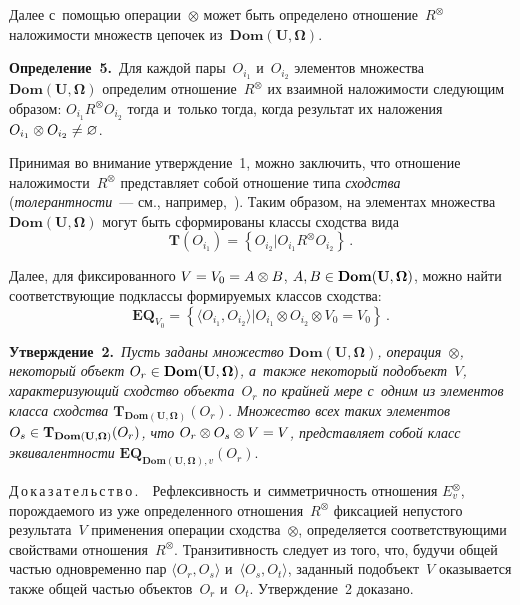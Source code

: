 \begin{multicols}{2}
  Далее с~помощью операции~$\otimes$ может быть определено 
отношение~$R^{\otimes}$ наложимости множеств цепочек 
из~$\mathbf{Dom}(\mathbf{U},\boldsymbol{\Omega})$.
  
  \smallskip
  
  \noindent
  \textbf{Определение~5.}\ Для каж\-дой пары~$O_{i_1}$ и~$O_{i_2}$ элементов 
множества $\mathbf{Dom}(\mathbf{U}, \boldsymbol{\Omega})$ определим 
отношение~$R^{\otimes}$ их взаимной на\-ло\-жи\-мости сле\-ду\-ющим образом: 
$O_{i_1} R^{\otimes} O_{i_2}$ тогда и~только тогда, когда результат их 
наложения $O_{i_1}\otimes O_{i_2}\hm\not= \varnothing$.
  
  \smallskip
  
  Принимая во внимание утверждение~1, можно заключить, что отношение 
на\-ло\-жи\-мости~$R^{\otimes}$ представляет собой отношение типа 
\textit{сходства} (\textit{то\-ле\-рант\-ности}~--- см., например,~\cite{4-gr, 5-gr}). 
Таким образом, на элементах множества $\mathbf{Dom}(\mathbf{U}, 
\boldsymbol{\Omega})$ могут быть сформированы классы сходства вида
  \begin{equation*}
  \mathbf{T}(O_{i_1})=\left\{ O_{i_2}\vert O_{i_1} R^{\otimes} O_{i_2}\right\}\,.
  \end{equation*}
  
  Далее, для фиксированного $V \hm= V_0 \hm= A\otimes B$, $A, B \hm\in 
\mathbf{Dom}(\mathbf{U}, \boldsymbol{\Omega})$, мож\-но найти 
соответствующие подклассы фор\-ми\-ру\-емых классов сходства:
  $$
  \mathbf{E}\mathbf{Q}_{V_0} =\left\{ \langle O_{i_1}, O_{i_2}\rangle \vert 
O_{i_1}\otimes O_{i_2} \otimes V_0=V_0\right\}\,.
  $$
  
  \noindent
  \textbf{Утверждение~2.}\ \textit{Пусть заданы множество 
$\mathbf{Dom}(\mathbf{U}, \boldsymbol{\Omega})$, операция~$\otimes$, 
некоторый объект $O_r \hm\in \mathbf{Dom}(\mathbf{U}, \boldsymbol{\Omega})$, 
а~также некоторый подобъект~$V$, характеризующий сходство объекта~$O_r$ 
по крайней мере с~одним из элементов класса сходства 
$\mathbf{T}_{\mathbf{Dom}(\mathbf{U}, \boldsymbol{\Omega})}(O_r)$. Множество всех таких 
элементов $O_s \hm\in \mathbf{T}_{\mathbf{Dom}(\mathbf{U}, \boldsymbol{\Omega})}(O_r)$, 
что $O_r\otimes O_s\otimes V \hm= V$, пред\-став\-ля\-ет собой класс экви\-ва\-лент\-ности} 
$\mathbf{E}\mathbf{Q}_{\mathbf{Dom}(\mathbf{U}, \boldsymbol{\Omega}),v}(O_r)$.
  
  \smallskip
  
  \noindent
  Д\,о\,к\,а\,з\,а\,т\,е\,л\,ь\,с\,т\,в\,о\,.\ \ Рефлексивность и~сим\-мет\-рич\-ность 
отношения $E_v^{\otimes}$, по\-рож\-да\-емо\-го из уже определенного 
отношения~$R^\otimes$ фиксацией не\-пус\-то\-го результата~$V$ применения 
операции сходства~$\otimes$, определяется со\-от\-вет\-ст\-ву\-ющи\-ми свойствами 
отношения~$R^\otimes$. Транзитивность следует из того, что, будучи общей 
частью одновременно пар $\langle O_r, O_s\rangle$ и~$\langle O_s, O_t\rangle$, 
заданный подобъект~$V$ оказывается также общей частью объектов~$O_r$ 
и~$O_t$. Утверждение~2 доказано.
  

\end{multicols}
